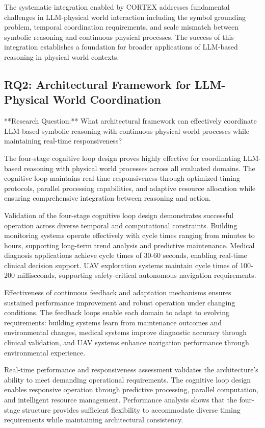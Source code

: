 The systematic integration enabled by CORTEX addresses fundamental challenges in LLM-physical world interaction including the symbol grounding problem, temporal coordination requirements, and scale mismatch between symbolic reasoning and continuous physical processes. The success of this integration establishes a foundation for broader applications of LLM-based reasoning in physical world contexts.

\subsection{RQ2: Architectural Framework for LLM-Physical World Coordination}

**Research Question:** What architectural framework can effectively coordinate LLM-based symbolic reasoning with continuous physical world processes while maintaining real-time responsiveness?

The four-stage cognitive loop design proves highly effective for coordinating LLM-based reasoning with physical world processes across all evaluated domains. The cognitive loop maintains real-time responsiveness through optimized timing protocols, parallel processing capabilities, and adaptive resource allocation while ensuring comprehensive integration between reasoning and action.

Validation of the four-stage cognitive loop design demonstrates successful operation across diverse temporal and computational constraints. Building monitoring systems operate effectively with cycle times ranging from minutes to hours, supporting long-term trend analysis and predictive maintenance. Medical diagnosis applications achieve cycle times of 30-60 seconds, enabling real-time clinical decision support. UAV exploration systems maintain cycle times of 100-200 milliseconds, supporting safety-critical autonomous navigation requirements.

Effectiveness of continuous feedback and adaptation mechanisms ensures sustained performance improvement and robust operation under changing conditions. The feedback loops enable each domain to adapt to evolving requirements: building systems learn from maintenance outcomes and environmental changes, medical systems improve diagnostic accuracy through clinical validation, and UAV systems enhance navigation performance through environmental experience.

Real-time performance and responsiveness assessment validates the architecture's ability to meet demanding operational requirements. The cognitive loop design enables responsive operation through predictive processing, parallel computation, and intelligent resource management. Performance analysis shows that the four-stage structure provides sufficient flexibility to accommodate diverse timing requirements while maintaining architectural consistency.

